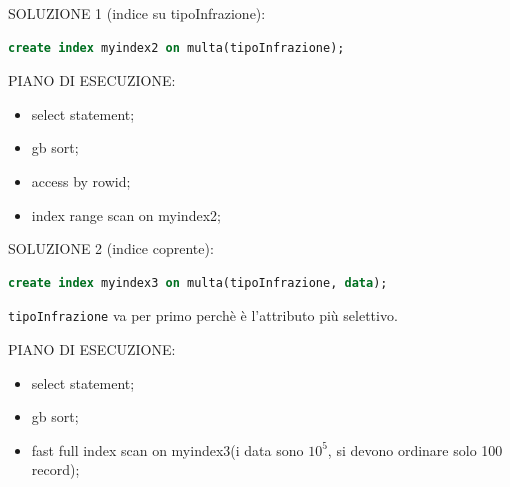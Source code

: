\documentclass[12pt]{article}
\begin{document}
\begin{example}{}{}
    SOLUZIONE 1 (indice su tipoInfrazione):
\begin{lstlisting}[language=sql]
create index myindex2 on multa(tipoInfrazione);
\end{lstlisting}
    PIANO DI ESECUZIONE:
    \begin{itemize}
        \item select statement;
        \item gb sort;
        \item access by rowid;
        \item index range scan on myindex2;
    \end{itemize}

    SOLUZIONE 2 (indice coprente):
\begin{lstlisting}[language=sql]
create index myindex3 on multa(tipoInfrazione, data);
\end{lstlisting}
    \texttt{tipoInfrazione} va per primo perch\`e \`e l'attributo pi\`u selettivo.
    
    PIANO DI ESECUZIONE:
    \begin{itemize}
        \item select statement;
        \item gb sort;
        \item fast full index scan on myindex3(i data sono $10^{5}$, si devono ordinare solo 100 record);
    \end{itemize}
\end{example}
\end{document}
